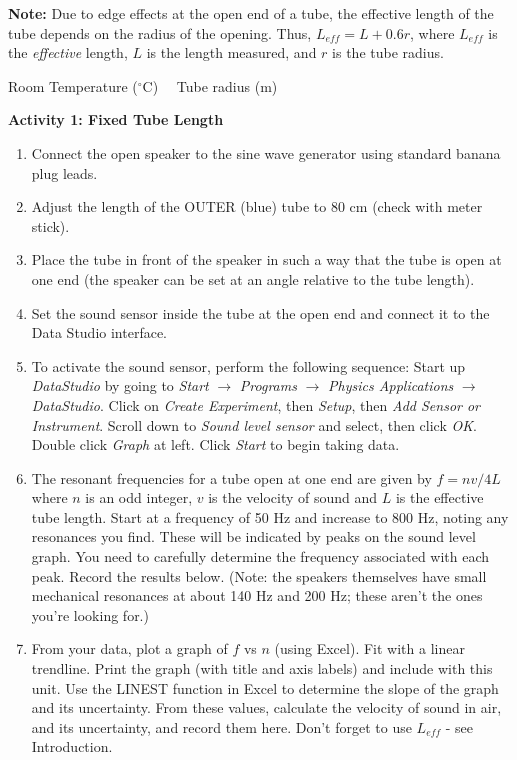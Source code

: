\textbf{Note:} Due to edge effects at the open end of a tube, the effective length of the tube depends on the radius of the opening. Thus, $L_{eff} = L + 0.6r$, where $L_{eff}$ is the \textit{effective} length, $L$ is the length measured, and $r$ is the tube radius.

\medskip
Room Temperature ($^\circ$C) \hrulefill \ \  Tube radius (m) \hrulefill

\bigskip

\textbf{Activity 1: Fixed Tube Length} 
\begin{enumerate}[labparts]

\item Connect the open speaker to the sine wave generator using standard banana plug leads.

\item Adjust the length of the OUTER (blue) tube to 80 cm (check with meter stick).

\item Place the tube in front of the speaker in such a way that the tube is open at one end (the speaker can be set at an angle relative to the tube length).

\item Set the sound sensor inside the tube at the open end and connect it to the Data Studio interface.

\item To activate the sound sensor, perform the following sequence:  Start up \textit{DataStudio} by going to \textit{Start} $\rightarrow$ \textit{Programs} $\rightarrow$ \textit{Physics Applications} $\rightarrow$ \textit{DataStudio}.
Click on \textit{Create Experiment}, then \textit{Setup}, then \textit{Add Sensor or Instrument}. Scroll down to \textit{Sound level sensor} and select, then click \textit{OK}. Double click \textit{Graph} at left. Click \textit{Start} to begin taking data.

\item The resonant frequencies for a tube open at one end are given by $f=nv/4L$ where $n$ is an odd integer, $v$ is the velocity of sound and $L$ is the effective tube length. Start at a frequency of 50 Hz and increase to 800 Hz, noting any resonances you find.   These will be indicated by peaks on the sound level graph. You need to carefully determine the frequency associated with each peak.  Record the results below. (Note: the speakers themselves have small mechanical resonances at about 140 Hz and 200 Hz; these aren't the ones you're looking for.)
\vspace{10mm}

\item From your data, plot a graph of $f$ vs $n$ (using Excel). Fit with a linear trendline. Print the graph (with title and axis labels) and include with this unit. Use the LINEST function in Excel to determine the slope of the graph and its uncertainty. From these values, calculate the velocity of sound in air, and its uncertainty, and record them here. Don't forget to use $L_{eff}$ - see Introduction.
\vspace{12mm}

\end{enumerate}

